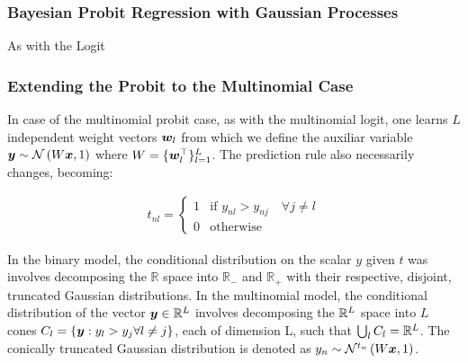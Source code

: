 %
%

\subsubsection{Bayesian Probit Regression with Gaussian Processes}
As with the Logit


\subsubsection{Extending the Probit to the Multinomial Case}
In case of the multinomial probit case, as with the multinomial logit, one learns $L$ independent weight vectors $\bm w_l$ from which we define the auxiliar variable $\bm y \sim \mathcal{N} \left( {W\bm x}, {1} \right)$ where $W = \{ \bm w_l^\top \}_{l=1}^L$. The prediction rule also necessarily changes, becoming:

\begin{align}
t_{nl} = \left\{ \begin{array}{lr} 1 & \text{if } y_{nl} > y_{nj} \quad \forall j \neq l \\ 0 & \text{otherwise} \end{array} \right.
\end{align}

In the binary model, the conditional distribution on the scalar $y$ given $t$ was involves decomposing the $\mathbb{R}$ space into $\mathbb{R}_-$ and $\mathbb{R}_+$ with their respective, disjoint, truncated Gaussian distributions. In the multinomial model, the conditional distribution of the vector $\bm y \in { \mathbb{R}^{L} }$ involves decomposing the ${ \mathbb{R}^{L} }$ space into $L$ cones $C_l = \{ \bm y : y_l > y_j \forall l \neq j \}$, each of dimension L, such that $\bigcup_l C_l = { \mathbb{R}^{L} }$. The conically truncated Gaussian distribution is denoted as $y_n \sim \mathcal{N}^{t_n}\left(W\bm x, 1\right)$. 

